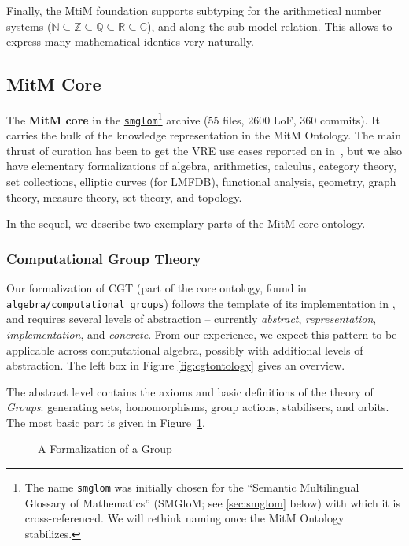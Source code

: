 Finally, the MtiM foundation supports subtyping for the arithmetical number systems ($\mathbb{N}\subseteq\mathbb{Z}\subseteq\mathbb{Q}\subseteq\mathbb{R}\subseteq\mathbb{C}$), and along the sub-model relation.
This allows to express many mathematical identies very naturally.


\subsection{MitM Core}

The \textbf{MitM core} in the \href{https://gl.mathhub.info/MitM/smglom}{\texttt{smglom}}\footnote{The name \texttt{smglom} was initially chosen for the ``Semantic Multilingual Glossary of Mathematics'' (SMGloM; see \ref{sec:smglom} below) with which it is cross-referenced. We will rethink naming once the MitM Ontology stabilizes.}  archive (55 files, 2600 LoF, 360 commits).
It carries the bulk of the knowledge representation in the MitM Ontology.
The main thrust of curation has been to get the VRE use cases reported on in~\cite{ODK-D6.5}, but we also have elementary formalizations of algebra, arithmetics, calculus, category theory, set collections, elliptic curves (for LMFDB), functional analysis, geometry, graph theory, measure theory, set theory, and topology.

In the sequel, we describe two exemplary parts of the MitM core ontology.

\subsubsection{Computational Group Theory}
Our formalization of CGT (part of the core ontology, found in \texttt{algebra/computational\_groups}) follows the template of its implementation in \GAP, and requires several levels of abstraction -- currently \emph{abstract}, \emph{representation}, \emph{implementation}, and \emph{concrete}. From our experience, we expect this pattern to be applicable across computational algebra, possibly with additional levels of abstraction. 
The left box in Figure \ref{fig:cgtontology} gives an overview.

The abstract level contains the axioms and basic definitions of the theory of \emph{Groups}: generating sets, homomorphisms, group actions, stabilisers, and orbits.
The most basic part is given in Figure~\ref{fig:mitm1}. 
\begin{figure}[ht]\centering
  \caption{A Formalization of a Group}\label{fig:mitm1}
\end{figure}

